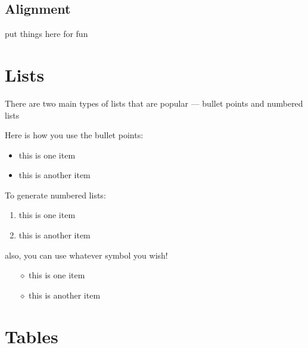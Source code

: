 \documentclass[a4paper,12pt]{article}
\begin{document}
 \subsection{Alignment}
 
 \begin{center} %
 	put things here for fun
 \end{center} %

\section{Lists}

There are two main types of lists that are popular --- bullet points and numbered lists

Here is how you use the bullet points:

\begin{itemize}
	\item this is one item
	\item this is another item
\end{itemize}

To generate numbered lists:


\begin{enumerate}
	\item this is one item
	\item this is another item
\end{enumerate}

also, you can use whatever symbol you wish!

\begin{itemize}
	\item[$\diamond$] this is one item
	\item[$\diamond$] this is another item
\end{itemize}


\section{Tables}
\end{document}
